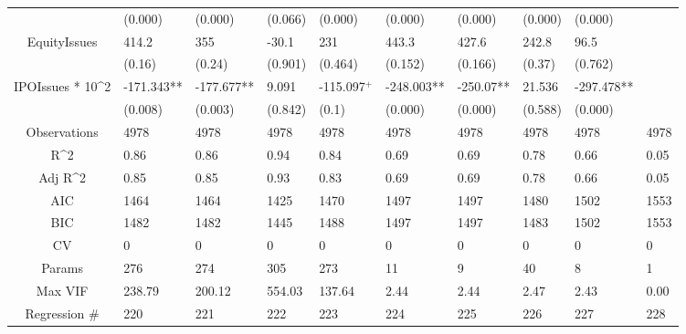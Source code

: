 \documentclass{article}
\begin{document}
\begin{table}[H]
\begin{tabular}{|clllllllll|}
   & (0.000) & (0.000) & (0.066) & (0.000) & (0.000) & (0.000) & (0.000) & (0.000) &  \\ 
  EquityIssues & 414.2 & 355 & -30.1 & 231 & 443.3 & 427.6 & 242.8 & 96.5 &  \\ 
   & (0.16) & (0.24) & (0.901) & (0.464) & (0.152) & (0.166) & (0.37) & (0.762) &  \\ 
  IPOIssues * 10^2 & -171.343** & -177.677** & 9.091 & -115.097$^{+}$ & -248.003** & -250.07** & 21.536 & -297.478** &  \\ 
   & (0.008) & (0.003) & (0.842) & (0.1) & (0.000) & (0.000) & (0.588) & (0.000) &  \\ 
  \hline 
 Observations & 4978 & 4978 & 4978 & 4978 & 4978 & 4978 & 4978 & 4978 & 4978 \\ 
  R^2 & 0.86 & 0.86 & 0.94 & 0.84 & 0.69 & 0.69 & 0.78 & 0.66 & 0.05 \\ 
  Adj R^2 & 0.85 & 0.85 & 0.93 & 0.83 & 0.69 & 0.69 & 0.78 & 0.66 & 0.05 \\ 
  AIC & 1464 & 1464 & 1425 & 1470 & 1497 & 1497 & 1480 & 1502 & 1553 \\ 
  BIC & 1482 & 1482 & 1445 & 1488 & 1497 & 1497 & 1483 & 1502 & 1553 \\ 
  CV & 0 & 0 & 0 & 0 & 0 & 0 & 0 & 0 & 0 \\ 
  Params & 276 & 274 & 305 & 273 & 11 & 9 & 40 & 8 & 1 \\ 
  Max VIF & 238.79 & 200.12 & 554.03 & 137.64 & 2.44 & 2.44 & 2.47 & 2.43 & 0.00 \\ 
  Regression \# & 220 & 221 & 222 & 223 & 224 & 225 & 226 & 227 & 228 \\ 
   \hline
\end{tabular}
 
\end{table}
\end{document}
